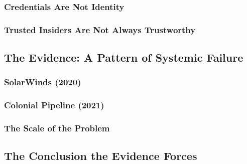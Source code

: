 \documentclass[12pt, letterpaper]{article}
\begin{document}
    \subsubsection{Credentials Are Not Identity}

    \subsubsection{Trusted Insiders Are Not Always Trustworthy}

\subsection{The Evidence: A Pattern of Systemic Failure}

    \subsubsection{SolarWinds (2020)}

    \subsubsection{Colonial Pipeline (2021)}

    \subsubsection{The Scale of the Problem}

\subsection{The Conclusion the Evidence Forces}
\end{document}
